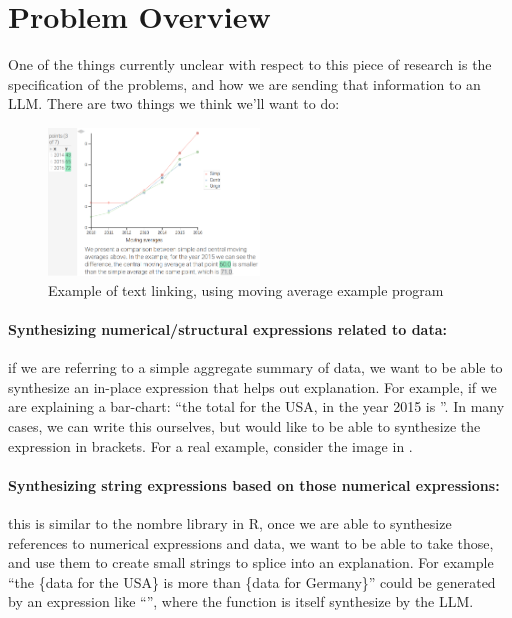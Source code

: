 \section{Problem Overview}
One of the things currently unclear with respect to this piece of research is the
specification of the problems, and how we are sending that information to an LLM.
There are two things we think we'll want to do:

\begin{figure}
   \includegraphics[width=0.5\textwidth]{fig/moving-average example.png}
   \caption{Example of text linking, using moving average example program}
   \label{fig:mavg}
\end{figure}

\paragraph*{Synthesizing numerical/structural expressions related to data:}
if we are referring to a simple aggregate summary of data, we want to be able
to synthesize an in-place expression that helps out explanation. For example,
if we are explaining a bar-chart: ``the total for the USA, in the year 2015 is
''. In many cases, we can write this ourselves,
but would like to be able to synthesize the expression in brackets.
For a real example, consider the image in . 

\paragraph*{Synthesizing string expressions based on those numerical expressions:}
this is similar to the nombre library in R, once we are able to synthesize references
to numerical expressions and data, we want to be able to take those, and use them to
create small strings to splice into an explanation. For example ``the \{data for the USA\} is more than \{data for Germany\}''
could be generated by an expression like ``'',
where the function  is itself synthesize by the LLM.
